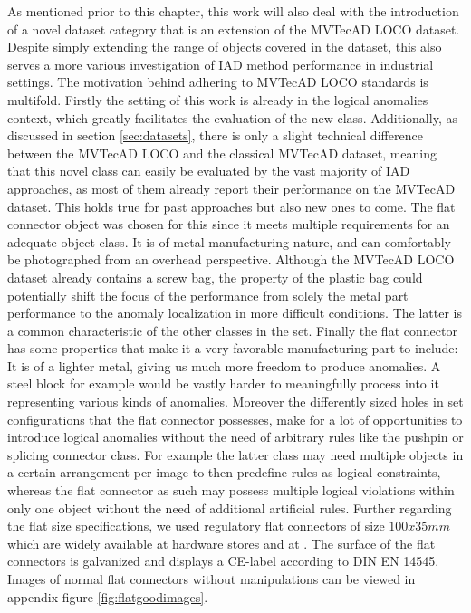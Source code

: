 As mentioned prior to this chapter, this work will also deal with the introduction of a novel dataset category that is an extension of the MVTecAD LOCO \cite{LOCODentsAndScratchesBergmann2022} dataset. 
Despite simply extending the range of objects covered in the dataset, this also serves a more various investigation of IAD method performance in industrial settings. The motivation behind adhering 
to MVTecAD LOCO standards is multifold. Firstly the setting of this work is already in the logical anomalies context, which greatly facilitates the evaluation of the new class. Additionally, as 
discussed in section \ref{sec:datasets}, there is only a slight technical difference between the MVTecAD LOCO and the classical MVTecAD \cite{MVTEC_Bergmann_2021} dataset, meaning that this novel 
class can easily be evaluated by the vast majority of IAD approaches, as most of them already report their performance on the MVTecAD dataset. This holds true for past approaches but also new ones 
to come.
\newline\newline
The flat connector object was chosen for this since it meets multiple requirements for an adequate object class. It is of metal manufacturing nature, and can comfortably be photographed from 
an overhead perspective. Although the MVTecAD LOCO dataset already contains a screw bag, the property of the plastic bag could potentially shift the focus of the performance from solely the metal 
part performance to the anomaly localization in more difficult conditions. The latter is a common characteristic of the other classes in the set. Finally the flat connector has some 
properties that make it a very favorable manufacturing part to include: It is of a lighter metal, giving us much more freedom to produce anomalies. A steel block for example would be vastly 
harder to meaningfully process into it representing various kinds of anomalies. Moreover the differently sized holes in set configurations that the flat connector possesses, make for a lot of opportunities 
to introduce logical anomalies without the need of arbitrary rules like the pushpin or splicing connector class. For example the latter class may need multiple objects in a certain arrangement per image to then predefine 
rules as logical constraints, whereas the flat connector as such may possess multiple logical violations within only one object without the need of additional artificial rules.
\newline
Further regarding the flat size specifications, we used regulatory flat 
connectors of size $100x35 mm$ which are widely available at hardware stores and at \cite{flatconnectorlink}. The surface of the flat connectors is galvanized 
and displays a CE-label according to DIN EN 14545. Images of normal flat connectors without manipulations can be viewed in appendix figure \ref{fig:flatgoodimages}.


